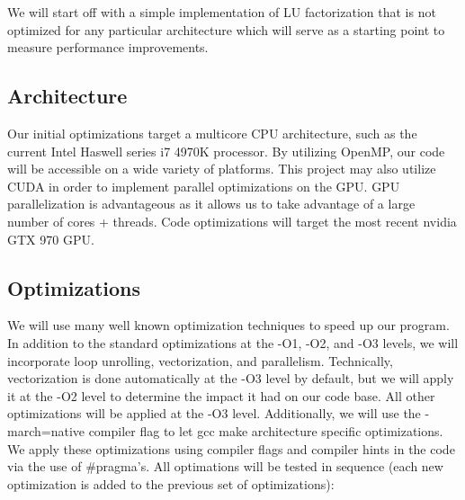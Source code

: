 \documentclass[12]{article}
\begin{document}
We will start off with a simple implementation of LU factorization that is not optimized for any particular architecture which will serve as a starting point to measure performance improvements.


\subsection{Architecture}

Our initial optimizations target a multicore CPU architecture, such as the current Intel Haswell series i7 4970K processor. By utilizing OpenMP, our code will be accessible on a wide variety of platforms. This project may also utilize CUDA in order to implement parallel optimizations on the GPU. GPU parallelization is advantageous as it allows us to take advantage of a large number of cores + threads. Code optimizations will target the most recent nvidia GTX 970 GPU. 

\subsection{Optimizations}

We will use many well known optimization techniques to speed up our program.  In addition to the standard optimizations at the -O1, -O2, and -O3 levels, we will incorporate loop unrolling, vectorization, and parallelism.  Technically, vectorization is done automatically at the -O3 level by default, but we will apply it at the -O2 level to determine the impact it had on our code base.  All other optimizations will be applied at the -O3 level.  Additionally, we will use the -march=native compiler flag to let gcc make architecture specific optimizations.  We apply these optimizations using compiler flags and compiler hints in the code via the use of \#pragma's.  All optimations will be tested in sequence (each new optimization is added to the previous set of optimizations):
\end{document}
